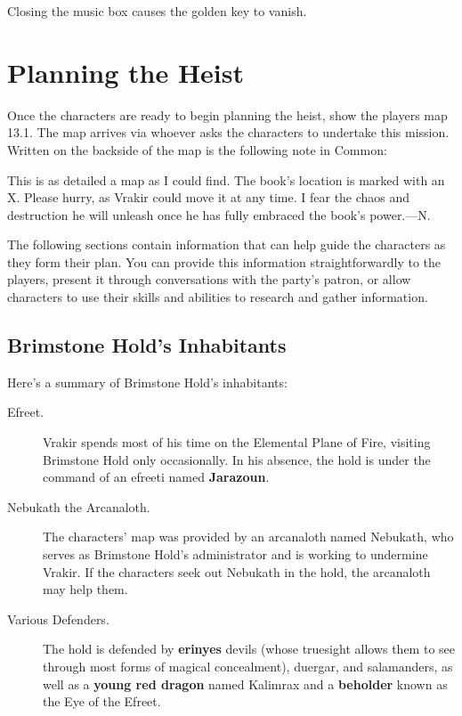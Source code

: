\documentclass[10pt,a4paper,twoside,bg=print,twocolumn,openany,nodeprecatedcode]{dndbook}
\begin{document}
Closing the music box causes the golden key to vanish.

\section{Planning the Heist}
Once the characters are ready to begin planning the heist, show the players map 13.1. The map arrives via whoever asks the characters to undertake this mission. Written on the backside of the map is the following note in Common:

\begin{DndReadAloud}{}
This is as detailed a map as I could find. The book's location is marked with an X. Please hurry, as Vrakir could move it at any time. I fear the chaos and destruction he will unleash once he has fully embraced the book's power.—N.

\end{DndReadAloud}

The following sections contain information that can help guide the characters as they form their plan. You can provide this information straightforwardly to the players, present it through conversations with the party's patron, or allow characters to use their skills and abilities to research and gather information.

\subsection{Brimstone Hold's Inhabitants}
Here's a summary of Brimstone Hold's inhabitants:


\begin{description}
\item[Efreet.]
Vrakir spends most of his time on the Elemental Plane of Fire, visiting Brimstone Hold only occasionally. In his absence, the hold is under the command of an efreeti named \textbf{Jarazoun}.
\item[Nebukath the Arcanaloth.]
The characters' map was provided by an arcanaloth named Nebukath, who serves as Brimstone Hold's administrator and is working to undermine Vrakir. If the characters seek out Nebukath in the hold, the arcanaloth may help them.
\item[Various Defenders.]
The hold is defended by \textbf{erinyes} devils (whose truesight allows them to see through most forms of magical concealment), duergar, and salamanders, as well as a \textbf{young red dragon} named Kalimrax and a \textbf{beholder} known as the Eye of the Efreet.
\end{description}
\end{document}

